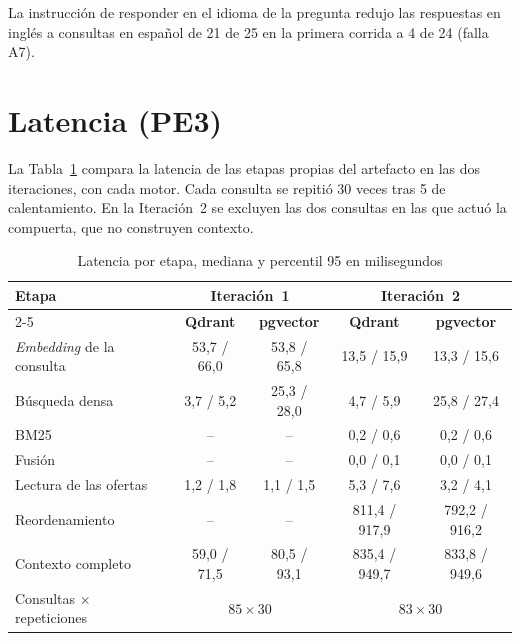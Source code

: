 La instrucción de responder en el idioma de la pregunta redujo las respuestas en inglés a consultas en español de 21 de 25 en la primera corrida a 4 de 24 (falla A7).


\section{Latencia (PE3)}
\label{sec:res-pe3}

La Tabla~\ref{tab:res-pe3-local} compara la latencia de las etapas propias del artefacto en las dos iteraciones, con cada motor. Cada consulta se repitió 30 veces tras 5 de calentamiento. En la Iteración~2 se excluyen las dos consultas en las que actuó la compuerta, que no construyen contexto.

\begin{table}[htbp!]
    \centering
    \caption{Latencia por etapa, mediana y percentil 95 en milisegundos}
    \label{tab:res-pe3-local}
    \small
    \begin{tabular}{|l|c|c|c|c|}
        \hline
        \multirow{2}{*}{\textbf{Etapa}} & \multicolumn{2}{c|}{\textbf{Iteración~1}} & \multicolumn{2}{c|}{\textbf{Iteración~2}} \\
        \cline{2-5}
         & \textbf{Qdrant} & \textbf{pgvector} & \textbf{Qdrant} & \textbf{pgvector} \\
        \hline
        \textit{Embedding} de la consulta & 53,7 / 66,0 & 53,8 / 65,8 & 13,5 / 15,9 & 13,3 / 15,6 \\
        \hline
        Búsqueda densa & 3,7 / 5,2 & 25,3 / 28,0 & 4,7 / 5,9 & 25,8 / 27,4 \\
        \hline
        BM25 & -- & -- & 0,2 / 0,6 & 0,2 / 0,6 \\
        \hline
        Fusión & -- & -- & 0,0 / 0,1 & 0,0 / 0,1 \\
        \hline
        Lectura de las ofertas & 1,2 / 1,8 & 1,1 / 1,5 & 5,3 / 7,6 & 3,2 / 4,1 \\
        \hline
        Reordenamiento & -- & -- & 811,4 / 917,9 & 792,2 / 916,2 \\
        \hline
        Contexto completo & 59,0 / 71,5 & 80,5 / 93,1 & 835,4 / 949,7 & 833,8 / 949,6 \\
        \hline
        Consultas $\times$ repeticiones & \multicolumn{2}{c|}{$85 \times 30$} & \multicolumn{2}{c|}{$83 \times 30$} \\
        \hline
    \end{tabular}
\end{table}

